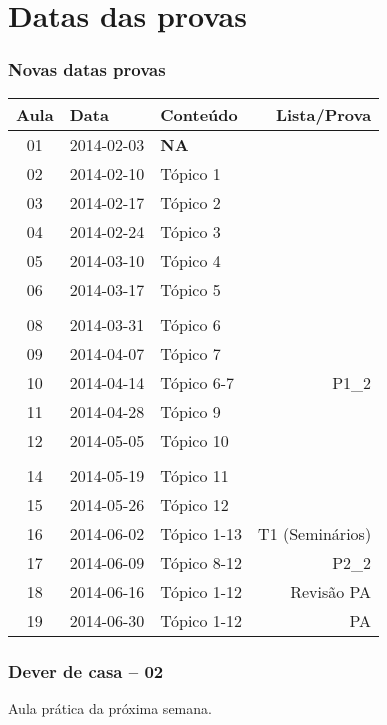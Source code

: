 \section{Datas das provas}
\begin{frame}
\frametitle{Novas datas provas}
{\scriptsize
  \begin{longtable}[c]{@{}cllr@{}}
  Aula & Data & Conteúdo & Lista/Prova \\
  \midrule\endhead
  01 & 2014-02-03 & {\bf NA}    & \\
  02 & 2014-02-10 & Tópico 1    & \\
  03 & 2014-02-17 & Tópico 2    & \\
  04 & 2014-02-24 & Tópico 3    & \\
  05 & 2014-03-10 & Tópico 4    & \\
  06 & 2014-03-17 & Tópico 5    & \\
  \color{red}{07} & \color{red}{2014-03-24} & \color{red}{Tópico 1-5}  & \color{red}{P1\_1} \\
  08 & 2014-03-31 & Tópico 6    & \\
  09 & 2014-04-07 & Tópico 7    & \\
  10 & 2014-04-14 & Tópico 6-7  & P1\_2 \\
  11 & 2014-04-28 & Tópico 9    & \\
  12 & 2014-05-05 & Tópico 10   & \\
  \color{red}{13} & \color{red}{2014-05-12} & \color{red}{Tópico 9-10}   & \color{red}{P2\_1}\\
  14 & 2014-05-19 & Tópico 11   & \\
  15 & 2014-05-26 & Tópico 12   & \\
  16 & 2014-06-02 & Tópico 1-13 & T1 (Seminários) \\
  17 & 2014-06-09 & Tópico 8-12 & P2\_2 \\
  18 & 2014-06-16 & Tópico 1-12 & Revisão PA \\
  19 & 2014-06-30 & Tópico 1-12 & PA \\
  \bottomrule
  \end{longtable}
  }
\end{frame}

\begin{frame}
  \frametitle{Dever de casa -- 02}
  Aula prática da próxima semana.
\end{frame}


